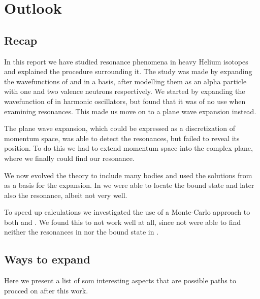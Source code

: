 \documentclass[../main/report.tex]{subfiles}
\begin{document}
\chapter{Outlook}
\label{cha:outlook}

\section{Recap}
In this report we have studied resonance phenomena in heavy Helium isotopes and explained the procedure surrounding it.
The study was made by expanding the wavefunctions of  and  in a basis, after modelling them as an alpha particle with one and two valence neutrons respectively.
We started by expanding the wavefunction of  in harmonic oscillators, but found that it was of no use when examining resonances.
This made us move on to a plane wave expansion instead.

The plane wave expansion, which could be expressed as a discretization of momentum space, was able to detect the resonances, but failed to reveal its position.
To do this we had to extend momentum space into the complex plane, where we finally could find our resonance.

We now evolved the theory to include many bodies and used the solutions from  as a basis for the  expansion.
In  we were able to locate the bound state and later also the resonance, albeit not very well.

To speed up calculations we investigated the use of a Monte-Carlo approach to both  and .
We found this to not work well at all, since not were able to find neither the resonances in  nor the bound state in .


\section{Ways to expand}
Here we present a list of som interesting aspects that are possible paths to procced on after this work.
\end{document}
